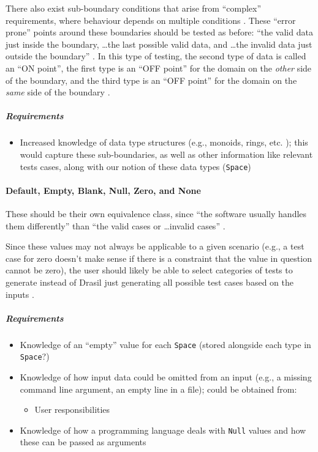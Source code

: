 There also exist sub-boundary conditions that arise from ``complex''
requirements, where behaviour depends on multiple conditions
\cite[p.~430]{van_vliet_software_2000}. These ``error prone'' points around
these boundaries should be tested \cite[p.~430]{van_vliet_software_2000} as
before: ``the valid data just inside the boundary, \dots the last possible
valid data, and \dots the invalid data just outside the boundary''
\cite[p.~73]{patton_software_2006}. In this type of testing, the second type of
data is called an ``ON point'', the first type is an ``OFF point'' for the
domain on the \emph{other} side of the boundary, and the third type is an ``OFF
point'' for the domain on the \emph{same} side of the boundary
\cite[p.~430]{van_vliet_software_2000}.

\subparagraph{Requirements}
\begin{itemize}
      \item Increased knowledge of data type structures (e.g., monoids, rings,
            etc. \cite{june_11_meeting}); this would capture these sub-boundaries,
            as well as other information like relevant tests cases, along with
            our notion of these data types (\texttt{Space})
\end{itemize}

\paragraph{Default, Empty, Blank, Null, Zero, and None
      \cite[pp.~77-78]{patton_software_2006}}

These should be their own equivalence class, since ``the software usually
handles them differently'' than ``the valid cases or \dots invalid cases''
\cite[p.~78]{patton_software_2006}.

Since these values may not always be applicable to a given scenario (e.g., a
test case for zero doesn't make sense if there is a constraint that the value
in question cannot be zero), the user should likely be able to select
categories of tests to generate instead of Drasil just generating all possible
test cases based on the inputs \cite{june_11_meeting}.

\subparagraph{Requirements}
\begin{itemize}
      \item Knowledge of an ``empty'' value for each \texttt{Space} (stored
            alongside each type in \texttt{Space}?)
      \item Knowledge of how input data could be omitted from an input
            (e.g., a missing command line argument, an empty line in a file);
            could be obtained from:
            \begin{itemize}
                  \item User responsibilities
            \end{itemize}
      \item Knowledge of how a programming language deals with \texttt{Null}
            values and how these can be passed as arguments
\end{itemize}


